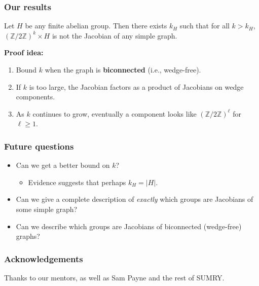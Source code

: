 \documentclass[mathserif, serif, xcolor=dvipsnames]{beamer}
\newcommand{\Z}{\ensuremath{\mathbb{Z}}}
\begin{document}
\begin{frame}
  \frametitle{Our results}
  \begin{theorem}
    Let $H$ be any finite abelian group. Then there exists $k_H$ such that for all $k>k_H$, $(\Z/2\Z)^k \times H$ is not the Jacobian of any simple graph. 
  \end{theorem}
  \vspace{0.6cm}

  \pause 

  \textbf{Proof idea:}
  \begin{enumerate}
  \item Bound $k$ when the graph is \textbf{biconnected}
    (i.e., wedge-free).
    \pause
  \item If $k$ is too large, the Jacobian factors as a product of
    Jacobians on wedge components.
    \pause
  \item As $k$ continues to grow, eventually a component looks like
    $(\Z/2\Z)^\ell$ for $\ell \ge 1$.
  \end{enumerate}

\end{frame}

\begin{frame}
  \frametitle{Future questions}
  \begin{itemize}
    \item Can we get a better bound on $k$?
    \medskip
      \pause
      \begin{itemize}
      \item Evidence suggests that perhaps $k_H=|H|$. 
      \end{itemize}
      \medskip
      \pause
    \item Can we give a complete description of \emph{exactly} which
      groups are Jacobians of some simple graph?
      \medskip
      \pause
    \item Can we describe which groups are Jacobians of biconnected (wedge-free)
      graphs?
  \end{itemize}
\end{frame}

\begin{frame}
  \frametitle{Acknowledgements}

  Thanks to our mentors, as well as Sam Payne and the rest of
  SUMRY.
  
\end{frame}

\end{document}
